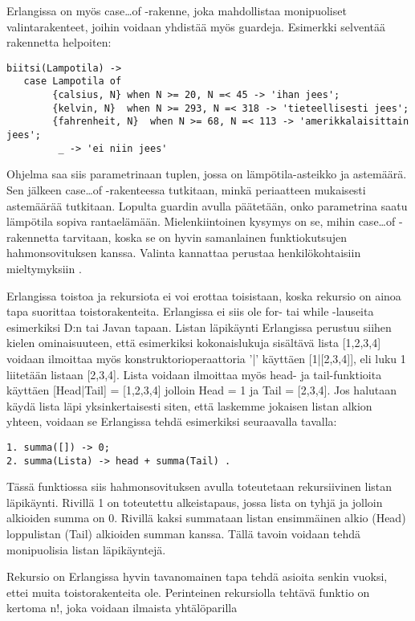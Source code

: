 \documentclass[11pt,oneside,a4paper]{article}
\begin{document}
Erlangissa on myös case…of -rakenne, joka mahdollistaa monipuoliset
valintarakenteet, joihin voidaan yhdistää myös guardeja. Esimerkki selventää
rakennetta helpoiten:
\begin{verbatim}
biitsi(Lampotila) -> 
   case Lampotila of
        {calsius, N} when N >= 20, N =< 45 -> 'ihan jees';
        {kelvin, N}  when N >= 293, N =< 318 -> 'tieteellisesti jees';  
        {fahrenheit, N}  when N >= 68, N =< 113 -> 'amerikkalaisittain jees'; 
         _ -> 'ei niin jees' 
\end{verbatim}
Ohjelma saa siis parametrinaan tuplen, jossa on lämpötila-asteikko ja astemäärä.
Sen jälkeen case…of -rakenteessa tutkitaan, minkä periaatteen
mukaisesti astemäärää tutkitaan. Lopulta guardin avulla päätetään, onko
parametrina saatu lämpötila sopiva rantaelämään. Mielenkiintoinen kysymys on se, mihin
case…of -rakennetta tarvitaan, koska se on hyvin samanlainen funktiokutsujen
hahmonsovituksen kanssa. Valinta kannattaa perustaa henkilökohtaisiin
mieltymyksiin \cite{HEB13}. 

Erlangissa toistoa ja rekursiota ei voi erottaa toisistaan, koska rekursio on
ainoa tapa suorittaa toistorakenteita. Erlangissa ei siis ole for- tai while
-lauseita esimerkiksi D:n tai Javan tapaan. Listan läpikäynti Erlangissa
perustuu
siihen kielen ominaisuuteen, että
esimerkiksi kokonaislukuja sisältävä lista [1,2,3,4]  voidaan ilmoittaa myös
konstruktorioperaattoria '|' käyttäen [1|[2,3,4]], eli luku 1 liitetään listaan
[2,3,4]. Lista voidaan ilmoittaa myös head- ja tail-funktioita käyttäen
[Head|Tail] = [1,2,3,4] jolloin Head = 1 ja Tail = [2,3,4].
Jos halutaan käydä lista läpi yksinkertaisesti siten, että laskemme jokaisen
listan alkion yhteen, voidaan se Erlangissa tehdä esimerkiksi seuraavalla tavalla:

\begin{verbatim}
1. summa([]) -> 0;
2. summa(Lista) -> head + summa(Tail) .  
\end{verbatim}
Tässä funktiossa siis hahmonsovituksen avulla toteutetaan rekursiivinen listan
läpikäynti. Rivillä 1 on toteutettu alkeistapaus, jossa lista on tyhjä ja
jolloin alkioiden summa on 0. Rivillä kaksi summataan listan ensimmäinen alkio
(Head) loppulistan 
(Tail) alkioiden summan kanssa. Tällä tavoin voidaan tehdä monipuolisia listan
läpikäyntejä. 

Rekursio on Erlangissa hyvin tavanomainen tapa tehdä asioita senkin vuoksi, ettei
muita
toistorakenteita ole. Perinteinen rekursiolla tehtävä funktio on kertoma n!,
joka voidaan ilmaista yhtälöparilla 
\end{document}
